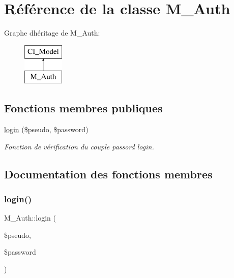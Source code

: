 \hypertarget{class_m___auth}{}\section{Référence de la classe M\+\_\+\+Auth}
\label{class_m___auth}
Graphe d\textquotesingle{}héritage de M\+\_\+\+Auth\+:\begin{figure}[H]
\begin{center}
\leavevmode
\includegraphics[height=2.000000cm]{class_m___auth}
\end{center}
\end{figure}
\subsection*{Fonctions membres publiques}
\begin{DoxyCompactItemize}
\item 
\hyperlink{class_m___auth_acc7f02bde90944646dde5a35c7dbcbd6}{login} (\$pseudo, \$password)
\begin{DoxyCompactList}\small\item\em Fonction de vérification du couple passord login. \end{DoxyCompactList}\end{DoxyCompactItemize}


\subsection{Documentation des fonctions membres}
\mbox{\label{class_m___auth_acc7f02bde90944646dde5a35c7dbcbd6}} 
\subsubsection{\texorpdfstring{login()}{login()}}
{\footnotesize\ttfamily M\+\_\+\+Auth\+::login (\begin{DoxyParamCaption}\item[{}]{\$pseudo,  }\item[{}]{\$password }\end{DoxyParamCaption})}




